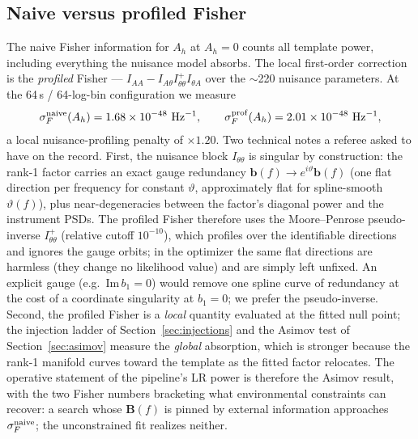 \documentclass[11pt]{article}
\newcommand{\Ah}{A_h}
\begin{document}
\subsection{Naive versus profiled Fisher}
The naive Fisher information for $\Ah$ at $\Ah = 0$ counts all template power, including everything the nuisance model absorbs. The local first-order correction is the \emph{profiled} Fisher --- $I_{AA} - I_{A\theta}I_{\theta\theta}^{+}I_{\theta A}$ over the $\sim$220 nuisance parameters. At the 64\,s / 64-log-bin configuration we measure
\begin{equation}
\sigma_F^{\rm naive}(\Ah) = 1.68\times10^{-48}~\mathrm{Hz^{-1}},
\qquad
\sigma_F^{\rm prof}(\Ah) = 2.01\times10^{-48}~\mathrm{Hz^{-1}},
\end{equation}
a local nuisance-profiling penalty of $\times1.20$. Two technical notes a referee asked to have on the record. First, the nuisance block $I_{\theta\theta}$ is singular by construction: the rank-1 factor carries an exact gauge redundancy $\mathbf{b}(f) \to e^{i\vartheta}\mathbf{b}(f)$ (one flat direction per frequency for constant $\vartheta$, approximately flat for spline-smooth $\vartheta(f)$), plus near-degeneracies between the factor's diagonal power and the instrument PSDs. The profiled Fisher therefore uses the Moore--Penrose pseudo-inverse $I_{\theta\theta}^{+}$ (relative cutoff $10^{-10}$), which profiles over the identifiable directions and ignores the gauge orbits; in the optimizer the same flat directions are harmless (they change no likelihood value) and are simply left unfixed. An explicit gauge (e.g.\ $\mathrm{Im}\,b_1 = 0$) would remove one spline curve of redundancy at the cost of a coordinate singularity at $b_1 = 0$; we prefer the pseudo-inverse. Second, the profiled Fisher is a \emph{local} quantity evaluated at the fitted null point; the injection ladder of Section~\ref{sec:injections} and the Asimov test of Section~\ref{sec:asimov} measure the \emph{global} absorption, which is stronger because the rank-1 manifold curves toward the template as the fitted factor relocates. The operative statement of the pipeline's LR power is therefore the Asimov result, with the two Fisher numbers bracketing what environmental constraints can recover: a search whose $\mathbf{B}(f)$ is pinned by external information approaches $\sigma_F^{\rm naive}$; the unconstrained fit realizes neither.
\end{document}

